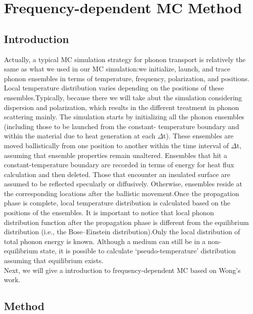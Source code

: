 \graphicspath{{Appendix1/}}
\chapter{Frequency-dependent MC Method}
\section*{Introduction}
Actually, a typical MC simulation strategy for phonon transport is relatively the same as what we used in our MC simulation:we initialize, launch, and trace phonon
ensembles in terms of temperature, frequency, polarization, and
positions. Local temperature distribution varies depending on the
positions of these ensembles.Typically, because there we will take abut the simulation considering dispersion and polarization, which results in the different treatment in phonon scattering mainly.
The simulation starts by initializing all the
phonon ensembles (including those to be launched from the constant-
temperature boundary and within the material due to heat
generation at each $\Delta$t). These ensembles are moved ballistically
from one position to another within the time interval of $\Delta$t, assuming
that ensemble properties remain unaltered. Ensembles that hit
a constant-temperature boundary are recorded in terms of energy
for heat flux calculation and then deleted. Those that encounter an
insulated surface are assumed to be reflected specularly or diffusively.
Otherwise, ensembles reside at the corresponding locations
after the ballistic movement.Once the propagation phase is complete,
local temperature distribution is calculated based on the
positions of the ensembles. It is important to notice that local phonon
distribution function after the propagation phase is different
from the equilibrium distribution (i.e., the Bose–Einstein distribution).Only the local distribution of total phonon energy is known.
Although a medium can still be in a non-equilibrium state, it is
possible to calculate ‘pseudo-temperature’ distribution\cite{BTE1} assuming
that equilibrium exists.\\
 Next, we will give a introduction to frequency-dependent MC based on Wong's work\cite{wongMC}.
\section*{Method}
